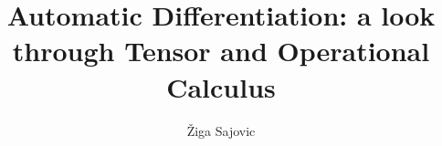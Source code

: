 
\title{Automatic Differentiation: a look through Tensor and Operational Calculus}
\author[1]{Žiga Sajovic}
\date{}


\maketitle











